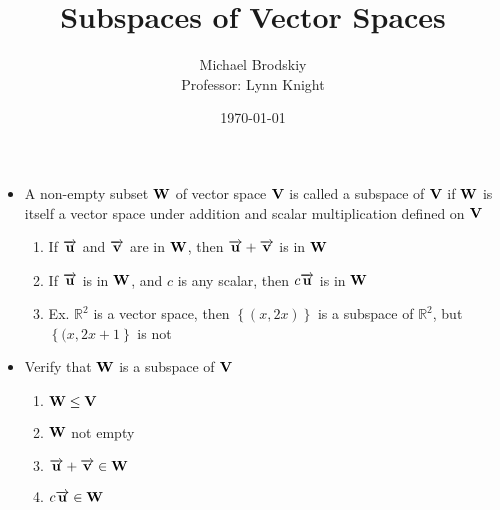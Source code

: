 \documentclass[12pt]{article}
\title{Subspaces of Vector Spaces}
\date{\today}
\author{Michael Brodskiy\\ \small Professor: Lynn Knight}
\begin{document}
\maketitle

\begin{itemize}

  \item A non-empty subset $\bold{W}$ of vector space $\bold{V}$ is called a subspace of $\bold{V}$ if $\bold{W}$ is itself a vector space under addition and scalar multiplication defined on $\bold{V}$

    \begin{enumerate}

      \item If $\overrightarrow{\bold{u}}$ and $\overrightarrow{\bold{v}}$ are in $\bold{W}$, then $\overrightarrow{\bold{u}} + \overrightarrow{\bold{v}}$ is in $\bold{W}$

      \item If $\overrightarrow{\bold{u}}$ is in $\bold{W}$, and $c$ is any scalar, then $c\overrightarrow{\bold{u}}$ is in $\bold{W}$

      \item Ex. $\mathbb{R}^2$ is a vector space, then $\left\{ (x,2x) \right\}$ is a subspace of $\mathbb{R}^2$, but $\left\{ (x,2x+1 \right\}$ is not

    \end{enumerate}

  \item Verify that $\bold{W}$ is a subspace of $\bold{V}$

    \begin{enumerate}

      \item $\bold{W}\leq \bold{V}$

      \item $\bold{W}$ not empty

      \item $\overrightarrow{\bold{u}} + \overrightarrow{\bold{v}} \in \bold{W}$

      \item $c\overrightarrow{\bold{u}} \in \bold{W}$

    \end{enumerate}

\end{itemize}
\end{document}
